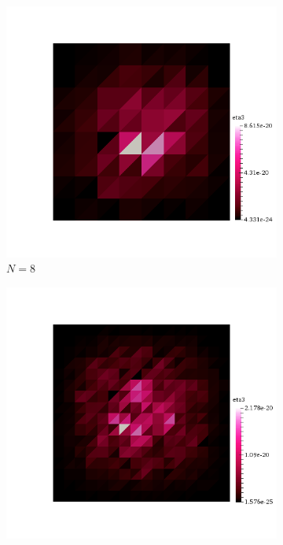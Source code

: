 \begin{figure}[h!]
  \centering
  \begin{subfigure}[b]{0.24\textwidth}
    \includegraphics[width=\textwidth,height=\textheight,keepaspectratio,height=\textheight,keepaspectratio]{figures/2_mpet/biomedical/space/eta3_8.png}
    \caption{$N=8$}
  \end{subfigure}
  \begin{subfigure}[b]{0.24\textwidth}
    \includegraphics[width=\textwidth,height=\textheight,keepaspectratio,height=\textheight,keepaspectratio]{figures/2_mpet/biomedical/space/eta3_16.png}

\end{subfigure}
\end{figure}
